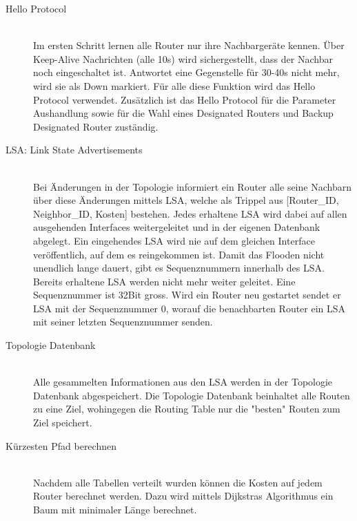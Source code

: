 \begin{description}
	\item[Hello Protocol] \hfill \\
	Im ersten Schritt lernen alle Router nur ihre Nachbargeräte kennen. Über Keep-Alive Nachrichten (alle 10s) wird sichergestellt, dass der Nachbar noch eingeschaltet ist. Antwortet eine Gegenstelle für 30-40s nicht mehr, wird sie als Down markiert. Für alle diese Funktion wird das Hello Protocol verwendet. Zusätzlich ist das Hello Protocol für die Parameter Aushandlung sowie für die Wahl eines Designated Routers und Backup Designated Router zuständig.
	\item[LSA: Link State Advertisements] \hfill \\
	Bei Änderungen in der Topologie informiert ein Router alle seine Nachbarn über diese Änderungen mittels LSA, welche als Trippel aus [Router\_ID, Neighbor\_ID, Kosten] bestehen. Jedes erhaltene LSA wird dabei auf allen ausgehenden Interfaces weitergeleitet und in der eigenen Datenbank abgelegt. Ein eingehendes LSA wird nie auf dem gleichen Interface veröffentlich, auf dem es reingekommen ist. Damit das Flooden nicht unendlich lange dauert, gibt es Sequenznummern innerhalb des LSA. Bereits erhaltene LSA werden nicht mehr weiter geleitet. Eine Sequenznummer ist 32Bit gross. Wird ein Router neu gestartet sendet er LSA mit der Sequenznummer 0, worauf die benachbarten Router ein LSA mit seiner letzten Sequenznummer senden.
	\item[Topologie Datenbank] \hfill \\
	Alle gesammelten Informationen aus den LSA werden in der Topologie Datenbank abgespeichert. Die Topologie Datenbank beinhaltet alle Routen zu eine Ziel, wohingegen die Routing Table nur die "besten" Routen zum Ziel speichert.
	\item[Kürzesten Pfad berechnen] \hfill \\
	Nachdem alle Tabellen verteilt wurden können die Kosten auf jedem Router berechnet werden. Dazu wird mittels Dijkstras Algorithmus ein Baum mit minimaler Länge berechnet. 
\end{description}

